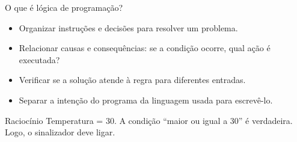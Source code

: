 \begin{frame}[t]{O que é lógica de programação?}
\begin{itemize}
\item Organizar instruções e decisões para resolver um problema.
\item Relacionar causas e consequências: se a condição ocorre, qual ação é executada?
\item Verificar se a solução atende à regra para diferentes entradas.
\item Separar a intenção do programa da linguagem usada para escrevê-lo.
\end{itemize}
\begin{exampleblock}{Raciocínio}
Temperatura = 30. A condição ``maior ou igual a 30'' é verdadeira. Logo, o sinalizador deve ligar.
\end{exampleblock}
\end{frame}
